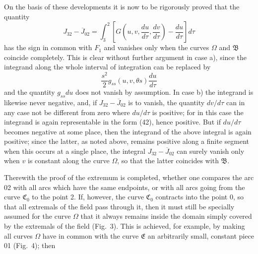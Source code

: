 \documentclass[11pt,a4paper,leqno]{article}
\begin{document}
On the basis of these developments it is now to be rigorously proved that the quantity
\[
J_{32}-\overline{J}_{02}
=\int_3^2\left[G\left(u,v,\frac{du}{d\tau},\frac{dv}{d\tau}\right)-\frac{du}{d\tau}\right]d\tau
\]
has the sign in common with $F_1$ and vanishes only when the curves $\Omega$ and $\mathfrak{B}$ coincide completely. This is clear without further argument in case a), since the integrand along the whole interval of integration can be replaced by
\begin{equation}\tag{42}
\frac{s^2}{2}g_{ss}(u,v,\theta s)\frac{du}{d\tau}
\end{equation}
and the quantity $g_{ss}du$ does not vanish by assumption. In case b) the integrand is likewise never negative, and, if $J_{32}-\overline{J}_{02}$ is to vanish, the quantity $dv/d\tau$ can in any case not be different from zero where $du/d\tau$ is positive; for in this case the integrand is again representable in the form (42), hence positive. But if $du/d\tau$ becomes negative at some place, then the integrand of the above integral is again positive; since the latter, as noted above, remains positive along a finite segment when this occurs at a single place, the integral $J_{32}-\overline{J}_{02}$ can surely vanish only when $v$ is constant along the curve $\Omega$, so that the latter coincides with $\mathfrak{B}$.

Therewith the proof of the extremum is completed, whether one compares the arc 02 with all arcs which have the same endpoints, or with all arcs going from the curve $\mathfrak{C}_0$ to the point 2. If, however, the curve $\mathfrak{C}_0$ contracts
into the point 0, so that all extremals of the field pass through it, then it must still be specially assumed for the curve $\Omega$ that it always remains inside the domain simply covered by the extremals of the field (Fig.~3). This is achieved, for example, by making all curves $\Omega$ have in common with the curve $\mathfrak{E}$ an arbitrarily small, constant piece 01 (Fig.~4); then
\end{document}
